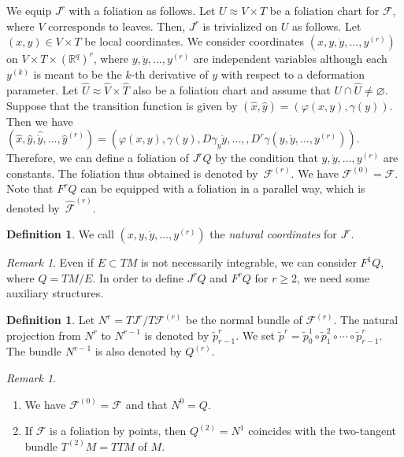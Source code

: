 \documentclass[12pt]{amsart}
\newcommand{\CF}{{\mathcal F}}
\newcommand{\R}{{\mathbb R}}
\theoremstyle{definition}
\newtheorem{definition}[theorem]{Definition}
\theoremstyle{remark}
\newtheorem{remark}[theorem]{Remark}
\begin{document}
We equip $J^r$ with a foliation as follows.
Let $U\approx V\times T$ be a foliation chart for $\CF$, where $V$ corresponds to leaves.
Then, $J^r$ is trivialized on $U$ as follows.
Let $(x,y)\in V\times T$ be local coordinates.
We consider coordinates $(x,y,\dot{y},\ldots,y^{(r)})$ on $V\times T\times(\R^q)^r$, where $y,\dot{y},\ldots,y^{(r)}$ are independent variables although each $y^{(k)}$ is meant to be the $k$-th derivative of $y$ with respect to a deformation parameter.
Let $\widehat{U}\approx\widehat{V}\times\widehat{T}$ also be a foliation chart and assume that $U\cap\widehat{U}\neq\varnothing$.
Suppose that the transition function is given by $(\widehat{x},\widehat{y})=(\varphi(x,y),\gamma(y))$.
Then we have $(\widehat{x},\widehat{y},\widehat{\dot{y}},\ldots,\widehat{y}^{(r)})=(\varphi(x,y),\gamma(y),D\gamma_y\dot{y},\ldots,,D^r\gamma(y,\dot{y},\ldots,y^{(r)}))$.
Therefore, we can define a foliation of $J^rQ$ by the condition that $y,\dot{y},\ldots,y^{(r)}$ are constants.
The foliation thus obtained is denoted by~$\CF^{(r)}$.
We have $\CF^{(0)}=\CF$.
Note that $F^rQ$ can be equipped with a foliation in a parallel way, which is denoted by~$\widehat\CF^{(r)}$.

\begin{definition}
We call $(x,y,\dot{y},\ldots,y^{(r)})$ the \textit{natural coordinates} for $J^r$.
\end{definition}

\begin{remark}
Even if $E\subset TM$ is not necessarily integrable, we can consider $F^1Q$, where $Q=TM/E$.
In order to define $J^rQ$ and $F^rQ$ for $r\geq2$, we need some auxiliary structures.
\end{remark}

\begin{definition}
Let $N^r=TJ^r/T\CF^{(r)}$ be the normal bundle of $\CF^{(r)}$.
The natural projection from $N^r$ to $N^{r-1}$ is denoted by $\widetilde{p}^r_{r-1}$.
We set $\widetilde{p}^r=\widetilde{p}^1_0\circ\widetilde{p}^2_1\circ\cdots\circ\widetilde{p}^r_{r-1}$.
The bundle $N^{r-1}$ is also denoted by $Q^{(r)}$.
\end{definition}

\begin{remark}
\begin{enumerate}
\item
We have $\CF^{(0)}=\CF$ and that $N^0=Q$.
\item
If $\CF$ is a foliation by points, then $Q^{(2)}=N^1$ coincides with the two-tangent bundle $T^{(2)}M=TTM$ of $M$.
\end{enumerate}
\end{remark}
\end{document}
